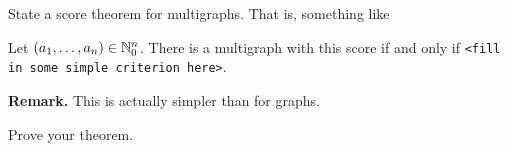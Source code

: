 
\begin{exercise}
  State a score theorem for multigraphs. That is, something like
  \begin{theorem}
     Let $(a_1,\dots,a_n) \in \mathbb{N}_0^n$. There is a multigraph
     with this score if and only if \texttt{\textup{<fill in some simple criterion here>}}.
  \end{theorem}
  
  
  \textbf{Remark.} This is actually
  simpler than for graphs.
\end{exercise}

\begin{exercise}
  Prove your theorem.
\end{exercise}

